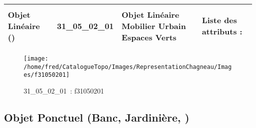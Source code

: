 \documentclass[12pt,titlepage]{book}
\begin{document}
\renewcommand{\arraystretch}{1.2}
\begin{supertabular}{|p{10cm}|c|p{13cm}|p{12cm}|}
 Objet Linéaire () & 31\_05\_02\_01 & Objet Linéaire Mobilier Urbain Espaces Verts & Liste des attributs :
\begin{enumerate}
\end{enumerate}
\\
\hline
\end{supertabular}
\begin{figure}[h!]
  \hfill         %
  \begin{minipage}[t]{3cm}
    \begin{center}
      \texttt{[image: /home/fred/CatalogueTopo/Images/RepresentationChagneau/Images/f31050201]}
      \caption[~31\_05\_02\_01]{\small{31\_05\_02\_01~:} \tiny{f31050201}}\label{f31050201}
    \end{center}
  \end{minipage}
\end{figure}


\subsection{Objet Ponctuel (Banc, Jardinière,  )}
\noindent
\vspace{\baselineskip}
\end{document}
